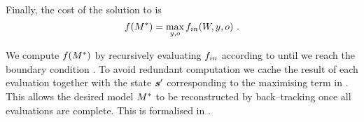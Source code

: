 Finally, the cost of the solution to  is
\begin{equation}
  \label{eq:opt-entry-point}
  \Objective(\OptimalScene) = 
  \max_{y,\WallOrient} \SubProbIN(\Width,y,\WallOrient) ~.
\end{equation}

We compute $\Objective(\Scene^*)$ by recursively evaluating
$\SubProbIN$ according to  until we reach the
boundary condition . To avoid redundant
computation we cache the result of each evaluation together with the
state $\State'$ corresponding to the maximising term in
. This allows the desired model
$\OptimalScene$ to be reconstructed by back--tracking once all
evaluations are complete. This is formalised in
.

